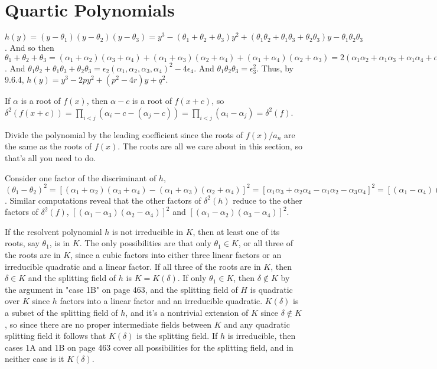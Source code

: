 \documentclass[11pt, oneside]{article}   	%
\begin{document}
\section{Quartic Polynomials}
\be
\item $h(y) = (y-\theta_1)(y-\theta_2)(y-\theta_3) = y^3 - (\theta_1 + \theta_2 + \theta_3)y^2 + (\theta_1\theta_2 + \theta_1\theta_3 + \theta_2\theta_3)y - \theta_1\theta_2\theta_3$. And so then $\theta_1 + \theta_2 + \theta_3 = (\alpha_1 + \alpha_2)(\alpha_3 + \alpha_4) + (\alpha_1 + \alpha_3)(\alpha_2 + \alpha_4) + (\alpha_1 + \alpha_4)(\alpha_2 + \alpha_3) = 2(\alpha_1\alpha_2 + \alpha_1\alpha_3 + \alpha_1\alpha_4 + \alpha_2\alpha_3 + \alpha_2\alpha_4 + \alpha_3\alpha_4) = 2\epsilon_2(\alpha_1, \alpha_2, \alpha_3, \alpha_4) = 2p$. And $\theta_1\theta_2 + \theta_1\theta_3 + \theta_2\theta_3 = \epsilon_2(\alpha_1, \alpha_2, \alpha_3, \alpha_4)^2 - 4\epsilon_4$. And $\theta_1\theta_2\theta_3 = \epsilon_3^2$. Thus, by 9.6.4, $h(y) = y^3 - 2py^2 + (p^2 - 4r) y + q^2$.
\item If $\alpha$ is a root of $f(x)$, then $\alpha - c$ is a root of $f(x + c)$, so $\delta^2(f(x + c)) = \prod_{i < j}(\alpha_i - c - (\alpha_j - c)) = \prod_{i < j}(\alpha_i - \alpha_j) = \delta^2(f)$. 
\item Divide the polynomial by the leading coefficient since the roots of $f(x) / a_n$ are the same as the roots of $f(x)$. The roots are all we care about in this section, so that's all you need to do.
\item Consider one factor of the discriminant of $h$, $(\theta_1 - \theta_2)^2 = [(\alpha_1 + \alpha_2)(\alpha_3 + \alpha_4) - (\alpha_1 + \alpha_3)(\alpha_2 + \alpha_4)]^2 = [\alpha_1\alpha_3 + \alpha_2\alpha_4 - \alpha_1\alpha_2 - \alpha_3\alpha_4]^2 = [(\alpha_1 - \alpha_4)(\alpha_3 - \alpha_2)]^2$. Similar computations reveal that the other factors of $\delta^2(h)$ reduce to the other factors of $\delta^2(f)$, $[(\alpha_1 - \alpha_3)(\alpha_2-\alpha_4)]^2$ and $[(\alpha_1 - \alpha_2)(\alpha_3 - \alpha_4)]^2$.
\item If the resolvent polynomial $h$ is not irreducible in $K$, then at least one of its roots, say $\theta_1$, is in $K$. The only possibilities are that only $\theta_1 \in K$, or all three of the roots are in $K$, since a cubic factors into either three linear factors or an irreducible quadratic and a linear factor. If all three of the roots are in $K$, then $\delta \in K$ and the splitting field of $h$ is $K = K(\delta)$. If only $\theta_1 \in K$, then $\delta \not \in K$ by the argument in "case 1B" on page 463, and the splitting field of $H$ is quadratic over $K$ since $h$ factors into a linear factor and an irreducible quadratic. $K(\delta)$ is a subset of the splitting field of $h$, and it's a nontrivial extension of $K$ since $\delta \not \in K$, so since there are no proper intermediate fields between $K$ and any quadratic splitting field it follows that $K(\delta)$ is the splitting field. If $h$ is irreducible, then cases 1A and 1B on page 463 cover all possibilities for the splitting field, and in neither case is it $K(\delta)$. 
\end{document}
